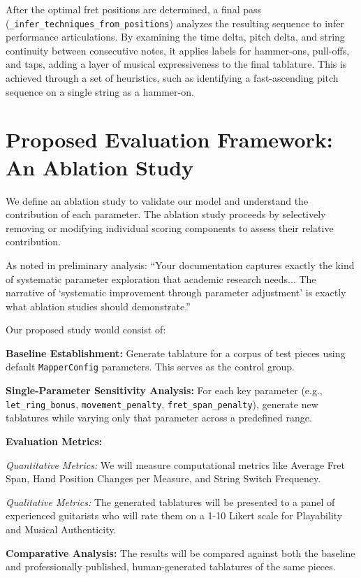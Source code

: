 \documentclass[conference]{IEEEtran}
\begin{document}
After the optimal fret positions are determined, a final pass (\texttt{\_infer\_techniques\_from\_positions}) analyzes the resulting sequence to infer performance articulations. By examining the time delta, pitch delta, and string continuity between consecutive notes, it applies labels for hammer-ons, pull-offs, and taps, adding a layer of musical expressiveness to the final tablature. This is achieved through a set of heuristics, such as identifying a fast-ascending pitch sequence on a single string as a hammer-on.

\section{Proposed Evaluation Framework: An Ablation Study}

We define an ablation study to validate our model and understand the contribution of each parameter. The ablation study proceeds by selectively removing or modifying individual scoring components to assess their relative contribution.

As noted in preliminary analysis: ``Your documentation captures exactly the kind of systematic parameter exploration that academic research needs... The narrative of `systematic improvement through parameter adjustment' is exactly what ablation studies should demonstrate.''

Our proposed study would consist of:

\textbf{Baseline Establishment:} Generate tablature for a corpus of test pieces using default \texttt{MapperConfig} parameters. This serves as the control group.

\textbf{Single-Parameter Sensitivity Analysis:} For each key parameter (e.g., \texttt{let\_ring\_bonus}, \texttt{movement\_penalty}, \texttt{fret\_span\_penalty}), generate new tablatures while varying only that parameter across a predefined range.

\textbf{Evaluation Metrics:}

\textit{Quantitative Metrics:} We will measure computational metrics like Average Fret Span, Hand Position Changes per Measure, and String Switch Frequency.

\textit{Qualitative Metrics:} The generated tablatures will be presented to a panel of experienced guitarists who will rate them on a 1-10 Likert scale for Playability and Musical Authenticity.

\textbf{Comparative Analysis:} The results will be compared against both the baseline and professionally published, human-generated tablatures of the same pieces.
\end{document}
